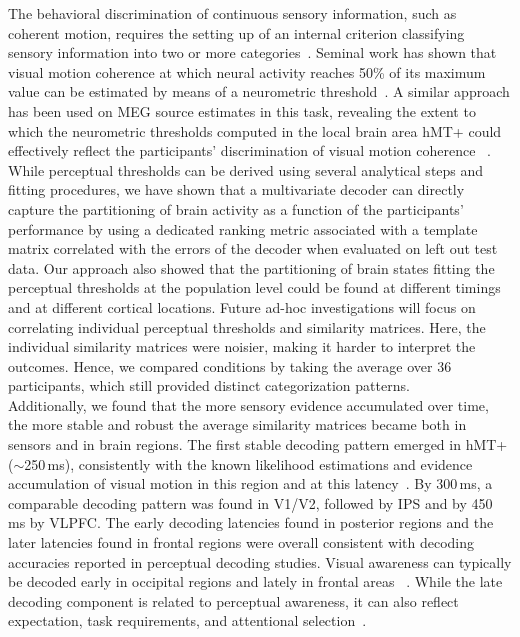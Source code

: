 The behavioral discrimination of continuous sensory information, such as coherent motion, requires the setting up of an internal criterion classifying sensory information into two or more categories~\cite{3jazayeri2006optimal,30britten1996relationship}. Seminal work has shown that visual motion coherence at which neural activity reaches 50\% of its maximum value can be estimated by means of a neurometric threshold~\cite{2britten1992analysis}. A similar approach has been used on MEG source estimates in this task, revealing the extent to which the neurometric thresholds computed in the local brain area hMT+ could effectively reflect the participants' discrimination of visual motion coherence ~\cite{23zilber2014supramodal}. While perceptual thresholds can be derived using several analytical steps and fitting procedures, we have shown that a multivariate decoder can directly capture the partitioning of brain activity as a function of the participants' performance by using a dedicated ranking metric associated with a template matrix correlated with the errors of the decoder when evaluated on left out test data. Our approach also showed that the partitioning of brain states fitting the perceptual thresholds at the population level could be found at different timings and at different cortical locations. Future ad-hoc investigations will focus on correlating individual perceptual thresholds and similarity matrices. Here, the individual similarity matrices were noisier, making it harder to interpret the outcomes. Hence, we compared conditions by  taking the average over 36 participants, which still provided distinct categorization patterns.\\

Additionally, we found that the more sensory evidence accumulated over time, the more stable and robust the average similarity matrices became both in sensors and in brain regions. The first stable decoding pattern emerged in hMT+ ($\sim$250\,ms), consistently with the known likelihood estimations and evidence accumulation of visual motion in this region and at this latency~\cite{2britten1992analysis,3jazayeri2006optimal}. By 300\,ms, a comparable decoding pattern was found in V1/V2, followed by IPS and by 450\,ms by VLPFC. The early decoding latencies found in posterior regions and the later latencies found in frontal regions were overall consistent with decoding accuracies reported in perceptual decoding studies. Visual awareness can typically be decoded early in occipital regions and lately in frontal areas~\cite{andersen2016occipital,mostert2015dissociating,de2011perceptual,salti2015distinct,king2016brain} . While the late decoding component is related to perceptual awareness, it can also reflect expectation, task requirements, and attentional selection~\cite{andersen2016occipital,mostert2015dissociating}.

